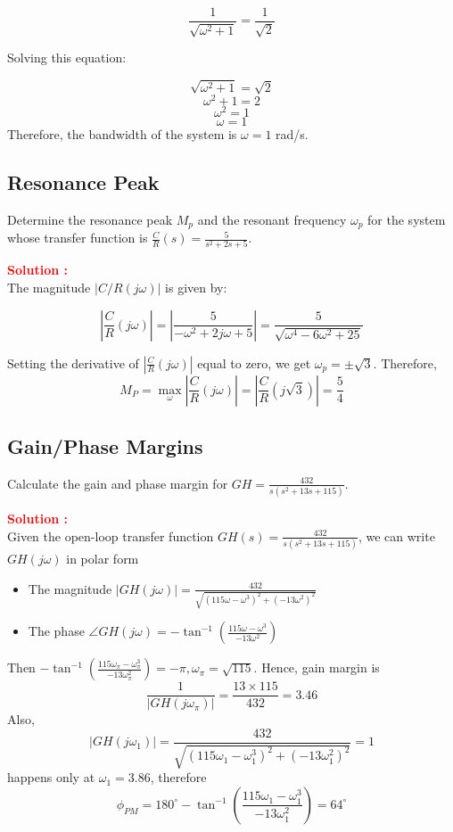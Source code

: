 \documentclass[12pt]{article}
\begin{document}
\[ \frac{1}{\sqrt{\omega^2 + 1}} = \frac{1}{\sqrt{2}} \]

Solving this equation:

\[ \sqrt{\omega^2 + 1} = \sqrt{2} \]
\[ \omega^2 + 1 = 2 \]
\[ \omega^2 = 1 \]
\[ \omega = 1 \]
Therefore, the bandwidth of the system is \(\omega = 1\) rad/s.
\clearpage

\subsection{Resonance Peak}

Determine the resonance peak \(M_p\) and the resonant frequency \(\omega_p\) for the system whose transfer function is \(\frac{C}{R}(s) = \frac{5}{s^2 + 2s + 5}\).

\textbf{\textcolor{red}{Solution :}} \\
The magnitude \(|C/R(j\omega)|\) is given by:

\[
\left| \frac{C}{R}(j\omega) \right| = \left| \frac{5}{- \omega^2 + 2j\omega + 5} \right| = \frac{5}{\sqrt{\omega^4 - 6\omega^2 + 25}}
\]

Setting the derivative of \(\left| \frac{C}{R}(j\omega) \right|\) equal to zero, we get \(\omega_p = \pm \sqrt{3}\). Therefore,
\begin{equation}
    M_P = \max_\omega \left| \frac{C}{R}(j\omega) \right| = \left| \frac{C}{R}(j\sqrt{3}) \right| = \frac{5}{4}
\end{equation}
\clearpage

\subsection{Gain/Phase Margins}

Calculate the gain and phase margin for \(GH = \frac{432}{s(s^2 + 13s + 115)}\).

\textbf{\textcolor{red}{Solution :}} \\
Given the open-loop transfer function \(GH(s) = \frac{432}{s(s^2 + 13s + 115)}\), we can write $GH(j\omega)$ in polar form
\begin{itemize}
    \item The magnitude $|GH(j\omega)| = \frac{432}{\sqrt{(115\omega-\omega^3)^2+(-13\omega^2)^2}}$
    \item The phase $\angle GH(j\omega) = - \tan^{-1}(\frac{115\omega - \omega^3}{-13\omega^2})$
\end{itemize}
Then \(- \tan^{-1}(\frac{115\omega_\pi - \omega_\pi^3}{-13\omega_\pi^2}) = -\pi, \omega_\pi =  \sqrt{115}\). Hence, gain margin is
\[ \frac{1}{|GH(j\omega_\pi)|} = \frac{13\times 115}{432} = 3.46\]
Also,
\[|GH(j\omega_1)| = \frac{432}{\sqrt{(115\omega_1-\omega_1^3)^2+(-13\omega_1^2)^2}} = 1\]
happens only at \(\omega_1  = 3.86\), therefore
\[\phi_{PM} = 180^\circ  - \tan^{-1}\left(\frac{115\omega_1 - \omega_1^3}{-13\omega_1^2}\right) = 64^\circ \]
\end{document}
